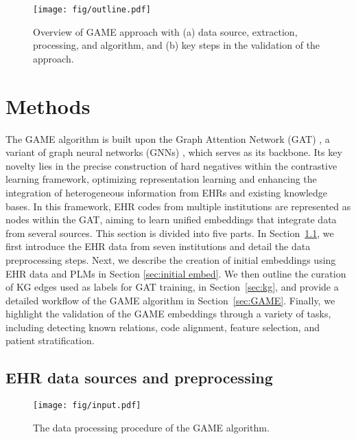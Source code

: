 \documentclass{article}
\begin{document}
\begin{figure}[ht]
    \centering
    \texttt{[image: fig/outline.pdf]}
    \caption{Overview of GAME approach with (a) data source, extraction, processing, and algorithm, and (b) key steps in the validation of the approach.}
    \label{fig:outline}
\end{figure}

\def\Esc{\mathcal{E}}
\def\Ssc{\mathcal{S}}
\def\Rsc{\mathcal{R}}
\def\Lscr{\mathscr{L}}

\section{Methods}\label{sec:method}
The GAME algorithm is built upon the Graph Attention Network (GAT) \cite{GAT}, a variant of graph neural networks (GNNs) \cite{gori2005new}, which serves as its backbone. Its key novelty lies in the precise construction of hard negatives within the contrastive learning framework, optimizing representation learning and enhancing the integration of heterogeneous information from EHRs and existing knowledge bases. In this framework, EHR codes from multiple institutions are represented as nodes within the GAT, aiming to learn unified embeddings that integrate data from several sources. This section is divided into five parts. In Section~\ref{sec:data}, we first introduce the EHR data from seven institutions and detail the data preprocessing steps. Next, we describe the creation of initial embeddings using EHR data and PLMs in Section \ref{sec:initial embed}. We then outline the curation of KG edges used as labels for GAT training, in Section~\ref{sec:kg}, and provide a detailed workflow of the GAME algorithm in Section~\ref{sec:GAME}. Finally, we highlight the validation of the GAME embeddings through a variety of tasks, including detecting known relations, code alignment, feature selection, and patient stratification.


\subsection{EHR data sources and preprocessing}
\label{sec:data}

\begin{figure}[ht]
    \centering
    \texttt{[image: fig/input.pdf]}
    \caption{The data processing procedure of the GAME algorithm.}
    \label{fig:input_plot}
\end{figure}
\end{document}
